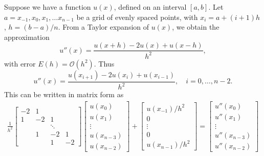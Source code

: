 \label{lab:finitedifference2}

Suppose we have a function $u(x)$, defined on an interval $[a,b]$. 
Let $a = x_{-1}, x_0, x_1, \ldots x_{n-1}$ be a grid of evenly spaced points, with $x_i = a + (i+1)h$, $h = (b-a)/n$. 
From a Taylor expansion of $u(x)$, we obtain the approximation 
\[u''(x) = \frac{u(x+h) - 2u(x) + u(x-h)}{h^2}, \]
with error $E(h) = \mathcal{O}(h^2)$. 
Thus 
\[u''(x) = \frac{u(x_{i+1}) - 2u(x_i) + u(x_{i-1})}{h^2}, \quad i = 0, \ldots, n-2.\]
This can be written in matrix form as 
\begin{align}
\frac{1}{h^2}
\begin{bmatrix}
-2 & 1 & \\
1 & -2 & 1  \\
& &\ddots & \\
 & 1 & -2 & 1 \\
 & & 1 & -2
\end{bmatrix}
\begin{bmatrix}
u(x_0) \\ u(x_1)\\ \vdots  \\ u(x_{n-3}) \\ u(x_{n-2})
\end{bmatrix} + 
\begin{bmatrix}
u(x_{-1})/h^2 \\ 0 \\ \vdots  \\ 0 \\ u(x_{n-1})/h^2
\end{bmatrix} = 
\begin{bmatrix}
u''(x_0) \\ u''(x_1)\\ \vdots  \\ u''(x_{n-3}) \\ u''(x_{n-2})
\end{bmatrix}\label{finitedifference2:upp}
\end{align}

